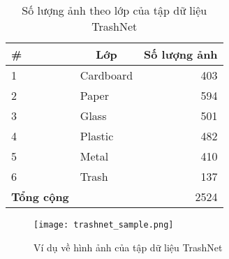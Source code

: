 \documentclass[../the.tex]{subfiles}
\begin{document}
\begin{table}[!ht]
	\centering
	\caption{Số lượng ảnh theo lớp của tập dữ liệu TrashNet}
	\begin{tabular}{|l|l|r|}
		\hline
		\multicolumn{1}{|l|}{
			\textbf{\#}}
		 & \multicolumn{1}{c|}{\textbf{Lớp}}
		 & \multicolumn{1}{c|}{\textbf{Số lượng ảnh}} \\
		\hline

		1
		 & Cardboard
		 & 403                                        \\
		\hline

		2
		 & Paper
		 & 594                                        \\
		\hline

		3
		 & Glass
		 & 501                                        \\
		\hline

		4
		 & Plastic
		 & 482                                        \\
		\hline

		5
		 & Metal
		 & 410                                        \\
		\hline

		6
		 & Trash
		 & 137                                        \\
		\hline


		\textbf{Tổng cộng}
		 &
		 & 2524                                       \\
		\hline
	\end{tabular}

	\label{tab:dataset}
\end{table}

\begin{figure}[H]
	\centering
	\texttt{[image: trashnet\_sample.png]}
	\caption{Ví dụ về hình ảnh của tập dữ liệu TrashNet}
	\label{fig:dataset_0}
\end{figure}
\end{document}
